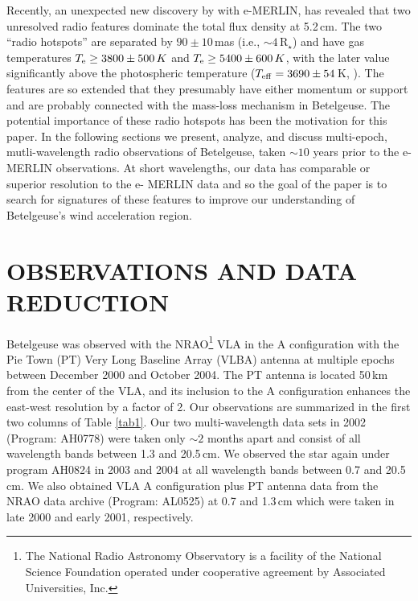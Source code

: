 \documentclass[iop]{emulateapj}
\begin{document}
Recently, an unexpected new discovery by \cite{richards_2013} with e-MERLIN, has revealed that two unresolved radio features dominate the total flux density at 5.2\,cm. The two ``radio hotspots'' are separated by $90\pm 10$\,mas (i.e., $\sim 4\,$R$_{\star}$) and have gas temperatures $T_{\rm{e}} \geq 3800\pm 500\,K$ and $T_{\rm{e}} \geq 5400\pm 600\,K$, with the later value significantly above the photospheric temperature ($T_{\rm{eff}}=3690\pm 54\,$K, \citealt{ohnaka_2011}). The features are so extended that they presumably have either momentum or support and are probably connected with the mass-loss mechanism in Betelgeuse. The potential importance of these radio hotspots has been the motivation for this paper. In the following sections we present, analyze, and discuss multi-epoch, mutli-wavelength radio observations of Betelgeuse, taken $\sim 10$ years prior to the e-MERLIN observations. At short wavelengths, our data has comparable or superior resolution to the e- MERLIN data and so the goal of the paper is to search for signatures of these features to improve our understanding of Betelgeuse's wind acceleration region.

\section{OBSERVATIONS AND DATA REDUCTION} 
Betelgeuse was observed with the NRAO\footnote{The National Radio Astronomy Observatory is a facility of
the National Science Foundation operated under cooperative agreement by Associated Universities, Inc.} VLA  in the A configuration with the Pie Town (PT) Very Long Baseline Array (VLBA) antenna at multiple epochs between December 2000 and October 2004. The PT antenna is located 50\,km from the center of the VLA, and its inclusion to the A configuration enhances the east-west resolution by a factor of 2. Our observations are summarized in the first two columns of Table \ref{tab1}. Our two multi-wavelength data sets in 2002 (Program: AH0778) were taken only $\sim 2$ months apart and consist of all wavelength bands between 1.3 and 20.5\,cm. We observed the star again under program AH0824 in 2003 and 2004 at all wavelength bands between 0.7 and 20.5\,cm. We also obtained VLA A configuration plus PT antenna data from the NRAO data archive (Program: AL0525) at  0.7 and 1.3\,cm which were taken in late 2000 and early 2001, respectively.
\end{document}

